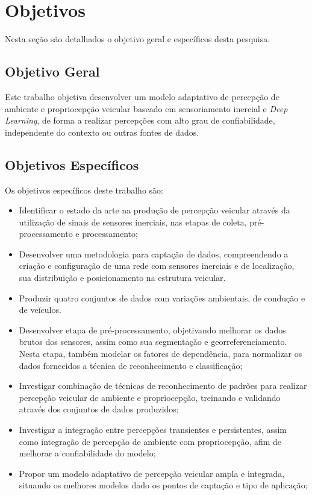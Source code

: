 \section{Objetivos}

Nesta seção são detalhados o objetivo geral e específicos desta pesquisa.

\subsection{Objetivo Geral}

Este trabalho objetiva desenvolver um modelo adaptativo de percepção de ambiente e propriocepção veicular baseado em sensoriamento inercial e \textit{Deep Learning}, de forma a realizar percepções com alto grau de confiabilidade, independente do contexto ou outras fontes de dados.

\subsection{Objetivos Específicos}

Os objetivos específicos deste trabalho são:

\begin{itemize}

\item Identificar o estado da arte na produção de percepção veicular através da utilização de sinais de sensores inerciais, nas etapas de coleta, pré-processamento e processamento;

\item Desenvolver uma metodologia para captação de dados, compreendendo a criação e configuração de uma rede com sensores inerciais e de localização, sua distribuição e posicionamento na estrutura veicular.

\item Produzir quatro conjuntos de dados com variações ambientais, de condução e de veículos.

\item Desenvolver etapa de pré-processamento, objetivando melhorar os dados brutos dos sensores, assim como sua segmentação e georreferenciamento. Nesta etapa, também modelar os fatores de dependência, para normalizar os dados fornecidos a técnica de reconhecimento e classificação;

\item Investigar combinação de técnicas de reconhecimento de padrões para realizar percepção veicular de ambiente e propriocepção, treinando e validando através dos conjuntos de dados produzidos;

\item Investigar a integração entre percepções transientes e persistentes, assim como integração de percepção de ambiente com propriocepção, afim de melhorar a confiabilidade do modelo;

\item Propor um modelo adaptativo de percepção veicular ampla e integrada, situando os melhores modelos dado os pontos de captação e tipo de aplicação;

\end{itemize}

